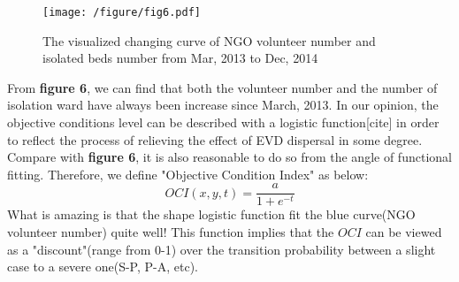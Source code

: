 \begin{figure}[htbp]
\centering
\texttt{[image: /figure/fig6.pdf]}
\caption{The visualized changing curve of NGO volunteer number and isolated beds number from Mar, 2013 to Dec, 2014}\label{fig:6}
\end{figure}

From \textbf{figure 6}, we can find that both the volunteer number and the number of isolation ward have always been increase since March, 2013. In our opinion, the objective conditions level can be described with a logistic function[cite] in order to reflect the process of relieving the effect of EVD dispersal in some degree. Compare with \textbf{figure 6}, it is also reasonable to do so from the angle of functional fitting. Therefore, we define "Objective Condition Index" as below:
\begin{equation}
OCI\left( x,y,t\right) =\dfrac {a}{1+e^{-t}}
\end{equation}
What is amazing is that the shape logistic function fit the blue curve(NGO volunteer number) quite well! This function implies that the $OCI$ can be viewed as a "discount"(range from 0-1) over the transition probability between a slight case to a severe one(S-P, P-A, etc).

